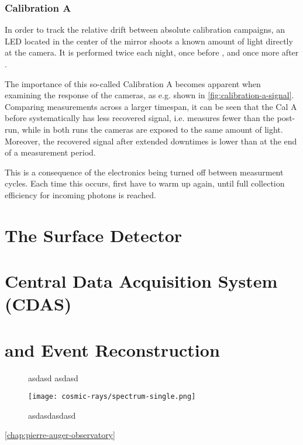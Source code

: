 \subsubsection{Calibration A}

In order to track the relative drift between absolute calibration campaigns, an 
LED located in the center of the mirror shoots a known amount of light directly 
at the \FD camera. It is performed twice each night, once before \DAQ, and once 
more after \DAQ.

The importance of this so-called Calibration A becomes apparent when examining the
response of the \FD cameras, as e.g. shown in \autoref{fig:calibration-a-signal}.
Comparing measurements across a larger timespan, it can be seen that the Cal A
before \DAQ systematically has less recovered signal, i.e. measures fewer \ADC
than the post-\DAQ run, while in both runs the cameras are exposed to the same 
amount of light. Moreover, the recovered signal after extended downtimes is lower
than at the end of a measurement period.

This is a consequence of the \PMT electronics being turned off between measurment 
cycles. Each time this occurs, \PMTs first have to warm up again, until full
collection efficiency for incoming photons is reached.



\section{The Surface Detector}
\label{sec:sd}


\section{Central Data Acquisition System (CDAS)}
\label{sec:cdas}



\section{\Offline and Event Reconstruction}
\label{sec:rec}

\begin{figure}[t]
  \centering
  \hspace{0.2cm}
  \caption[]{ asdasd  asdasd}
  \label{fig:}
\end{figure}

\begin{figure}[t]
  \centering
  \texttt{[image: cosmic-rays/spectrum-single.png]}
  \caption{asdasdasdasd}
  \label{fig:asdasd}
\end{figure}

\cref{chap:pierre-auger-observatory} 
